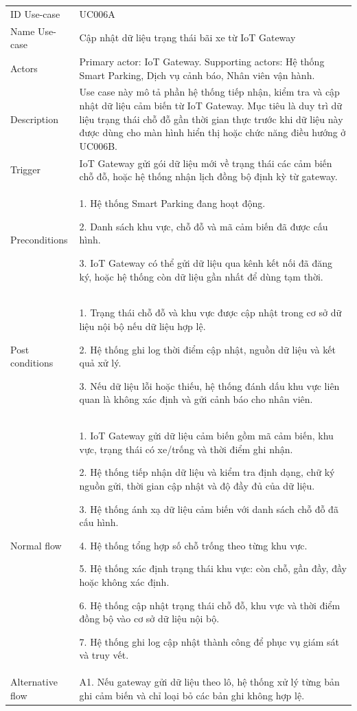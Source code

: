\begin{center}
\begin{longtable}{|m{2.7cm}|m{12.8cm}|}
\hline
ID Use-case  & UC006A \\ 
Name Use-case & Cập nhật dữ liệu trạng thái bãi xe từ IoT Gateway \\ 
\hline
Actors & Primary actor: IoT Gateway. Supporting actors: Hệ thống Smart Parking, Dịch vụ cảnh báo, Nhân viên vận hành.\\
\hline
Description & Use case này mô tả phần hệ thống tiếp nhận, kiểm tra và cập nhật dữ liệu cảm biến từ IoT Gateway. Mục tiêu là duy trì dữ liệu trạng thái chỗ đỗ gần thời gian thực trước khi dữ liệu này được dùng cho màn hình hiển thị hoặc chức năng điều hướng ở UC006B.\\
\hline
Trigger & IoT Gateway gửi gói dữ liệu mới về trạng thái các cảm biến chỗ đỗ, hoặc hệ thống nhận lịch đồng bộ định kỳ từ gateway.\\
\hline
Preconditions & 
1. Hệ thống Smart Parking đang hoạt động.

2. Danh sách khu vực, chỗ đỗ và mã cảm biến đã được cấu hình.

3. IoT Gateway có thể gửi dữ liệu qua kênh kết nối đã đăng ký, hoặc hệ thống còn dữ liệu gần nhất để dùng tạm thời.\\
\hline
Post conditions & 
1. Trạng thái chỗ đỗ và khu vực được cập nhật trong cơ sở dữ liệu nội bộ nếu dữ liệu hợp lệ.

2. Hệ thống ghi log thời điểm cập nhật, nguồn dữ liệu và kết quả xử lý.

3. Nếu dữ liệu lỗi hoặc thiếu, hệ thống đánh dấu khu vực liên quan là không xác định và gửi cảnh báo cho nhân viên.\\
\hline
Normal flow & 
1. IoT Gateway gửi dữ liệu cảm biến gồm mã cảm biến, khu vực, trạng thái có xe/trống và thời điểm ghi nhận.

2. Hệ thống tiếp nhận dữ liệu và kiểm tra định dạng, chữ ký nguồn gửi, thời gian cập nhật và độ đầy đủ của dữ liệu.

3. Hệ thống ánh xạ dữ liệu cảm biến với danh sách chỗ đỗ đã cấu hình.

4. Hệ thống tổng hợp số chỗ trống theo từng khu vực.

5. Hệ thống xác định trạng thái khu vực: còn chỗ, gần đầy, đầy hoặc không xác định.

6. Hệ thống cập nhật trạng thái chỗ đỗ, khu vực và thời điểm đồng bộ vào cơ sở dữ liệu nội bộ.

7. Hệ thống ghi log cập nhật thành công để phục vụ giám sát và truy vết.\\
\hline
Alternative flow & 
A1. Nếu gateway gửi dữ liệu theo lô, hệ thống xử lý từng bản ghi cảm biến và chỉ loại bỏ các bản ghi không hợp lệ.


\end{longtable}
\end{center}
